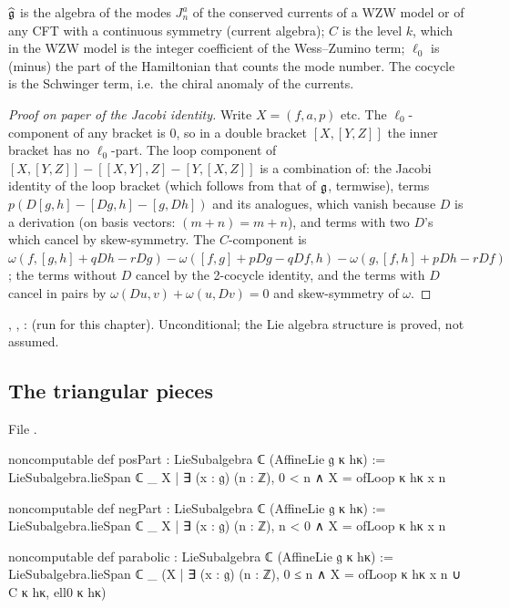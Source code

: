 \begin{physics}
$\widehat{\mathfrak{g}}$ is the algebra of the modes $J^a_n$ of the conserved currents of a WZW model or of any
CFT with a continuous symmetry (current algebra); $C$ is the level $k$, which in the WZW model is
the integer coefficient of the Wess--Zumino term; $\ell_0$ is (minus) the part of the Hamiltonian
that counts the mode number. The cocycle is the Schwinger term, i.e.\ the chiral anomaly of the
currents.
\end{physics}

\begin{proof}[Proof on paper of the Jacobi identity]
Write $X = (f,a,p)$ etc. The $\ell_0$-component of any bracket is $0$, so in a double bracket
$[X,[Y,Z]]$ the inner bracket has no $\ell_0$-part. The loop component of
$[X,[Y,Z]] - [[X,Y],Z] - [Y,[X,Z]]$ is a combination of: the Jacobi identity of the loop bracket
(which follows from that of $\mathfrak{g}$, termwise), terms $p(D[g,h] - [Dg,h]-[g,Dh])$ and its analogues,
which vanish because $D$ is a derivation (on basis vectors: $(m+n) = m + n$), and terms with two
$D$'s which cancel by skew-symmetry. The $C$-component is
$\omega(f,[g,h]+qDh-rDg) - \omega([f,g]+pDg-qDf,h) - \omega(g,[f,h]+pDh-rDf)$; the terms without $D$
cancel by the 2-cocycle identity, and the terms with $D$ cancel in pairs by
$\omega(Du,v) + \omega(u,Dv) = 0$ and skew-symmetry of $\omega$.
\end{proof}

\begin{status}
\allowbreak{}\allowbreak{}\allowbreak{}, \allowbreak{},
\allowbreak{}\allowbreak{}\allowbreak{}\allowbreak{}:  (run for this
chapter). Unconditional; the Lie algebra structure is proved, not assumed.
\end{status}

\subsection{The triangular pieces}

File .
\begin{leancode}
noncomputable def posPart : LieSubalgebra ℂ (AffineLie 𝔤 κ hκ) :=
  LieSubalgebra.lieSpan ℂ _ {X | ∃ (x : 𝔤) (n : ℤ), 0 < n ∧ X = ofLoop κ hκ x n}

noncomputable def negPart : LieSubalgebra ℂ (AffineLie 𝔤 κ hκ) :=
  LieSubalgebra.lieSpan ℂ _ {X | ∃ (x : 𝔤) (n : ℤ), n < 0 ∧ X = ofLoop κ hκ x n}

noncomputable def parabolic : LieSubalgebra ℂ (AffineLie 𝔤 κ hκ) :=
  LieSubalgebra.lieSpan ℂ _
    ({X | ∃ (x : 𝔤) (n : ℤ), 0 ≤ n ∧ X = ofLoop κ hκ x n} ∪ {C κ hκ, ell0 κ hκ})
\end{leancode}


